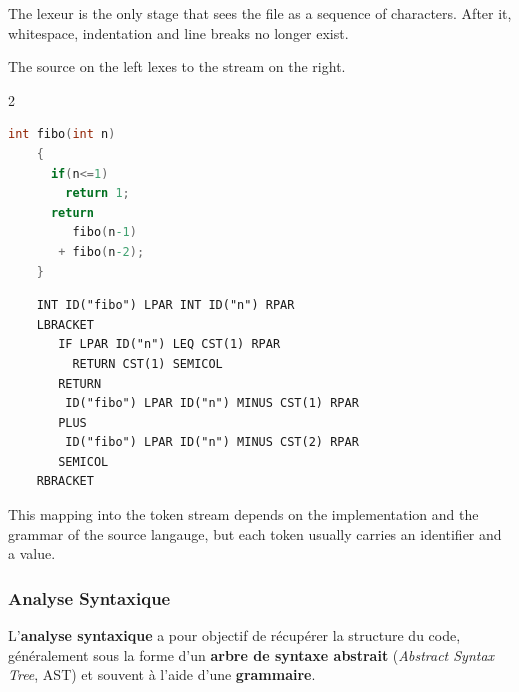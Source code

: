 The lexeur is the only stage that sees the file as a sequence of characters.
After it, whitespace, indentation and line breaks no longer exist.

\begin{example}
  The source on the left lexes to the stream on the right.
  \begin{multicols}{2}
    \begin{lstlisting}[language=C]
    int fibo(int n)
    {
      if(n<=1)
        return 1;
      return
         fibo(n-1)
       + fibo(n-2);
    }
    \end{lstlisting}
    \vfill\null
    \begin{lstlisting}
    INT ID("fibo") LPAR INT ID("n") RPAR
    LBRACKET
       IF LPAR ID("n") LEQ CST(1) RPAR
         RETURN CST(1) SEMICOL
       RETURN
        ID("fibo") LPAR ID("n") MINUS CST(1) RPAR
       PLUS
        ID("fibo") LPAR ID("n") MINUS CST(2) RPAR
       SEMICOL
    RBRACKET
    \end{lstlisting}
  \end{multicols}
\end{example}

\begin{remark}
This mapping into the token stream depends on the implementation and the
grammar of the source langauge, but each token usually carries an identifier
and a value.
\end{remark}

\subsubsection{Analyse Syntaxique}
\begin{definition}
  L'\textbf{analyse syntaxique} a pour objectif de récupérer la structure du
  code, généralement sous la forme d'un \textbf{arbre de syntaxe abstrait}
  (\textit{Abstract Syntax Tree}, AST) et souvent à l'aide d'une \textbf{grammaire}.
\end{definition}

